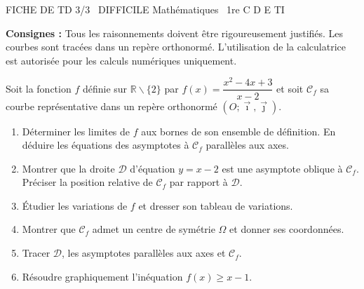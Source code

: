 \documentclass[11pt]{article}
\def\setminus{\mathbin{\backslash}}\let\smallsetminus\setminus
\begin{document}
\begin{tcolorbox}[enhanced,colback=popink,colframe=popink,arc=10pt,boxrule=0pt,left=12pt,right=12pt,top=9pt,bottom=9pt]
{\color{white}\popxbold\small FICHE DE TD 3/3 \textbullet\ DIFFICILE \hfill Mathématiques \textbullet\ 1re C D E TI\par}
\end{tcolorbox}
\vspace{4pt}
\textbf{Consignes :} Tous les raisonnements doivent être rigoureusement justifiés. Les courbes sont tracées dans un repère orthonormé. L'utilisation de la calculatrice est autorisée pour les calculs numériques uniquement.

\begin{exercice}
Soit la fonction $f$ définie sur $\mathbb{R}\setminus\{2\}$ par $f(x)=\dfrac{x^2-4x+3}{x-2}$ et soit $\mathcal{C}_f$ sa courbe représentative dans un repère orthonormé $(O;\vec{\imath},\vec{\jmath})$.
\begin{enumerate}
    \item Déterminer les limites de $f$ aux bornes de son ensemble de définition. En déduire les équations des asymptotes à $\mathcal{C}_f$ parallèles aux axes.
    \item Montrer que la droite $\mathcal{D}$ d'équation $y=x-2$ est une asymptote oblique à $\mathcal{C}_f$. Préciser la position relative de $\mathcal{C}_f$ par rapport à $\mathcal{D}$.
    \item Étudier les variations de $f$ et dresser son tableau de variations.
    \item Montrer que $\mathcal{C}_f$ admet un centre de symétrie $\Omega$ et donner ses coordonnées.
    \item Tracer $\mathcal{D}$, les asymptotes parallèles aux axes et $\mathcal{C}_f$.
    \item Résoudre graphiquement l'inéquation $f(x) \geqslant x-1$.
\end{enumerate}
\end{exercice}
\end{document}
